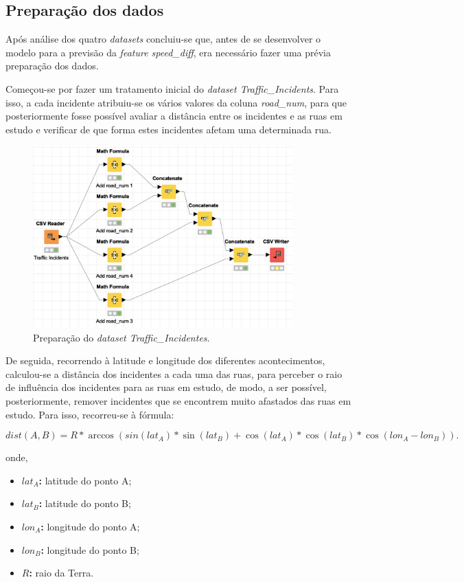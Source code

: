 \documentclass[a4paper, 12pt]{article}
\begin{document}
\subsection{Preparação dos dados}
\label{section:falta}

Após análise dos quatro \textit{datasets} concluiu-se que, antes de se desenvolver o modelo para a previsão da \textit{feature speed\_diff}, era necessário fazer uma prévia preparação dos dados.

Começou-se por fazer um tratamento inicial do \textit{dataset Traffic\_Incidents}. Para isso, a cada incidente atribuiu-se os vários valores da coluna \textit{road\_num}, para que posteriormente fosse possível avaliar a distância entre os incidentes e as ruas em estudo e verificar de que forma estes incidentes afetam uma determinada rua.

\begin{figure}[H]
	\centering
	\includegraphics[width=10cm]{Traffic_Incidents}
	\caption{Preparação do \textit{dataset Traffic\_Incidentes}.}
\end{figure}

De seguida, recorrendo à latitude e longitude dos diferentes acontecimentos, calculou-se a distância dos incidentes a cada uma das ruas, para perceber o raio de influência dos incidentes para as ruas em estudo, de modo, a ser possível, posteriormente, remover incidentes que se encontrem muito afastados das ruas em estudo. Para isso, recorreu-se à fórmula:

$$dist(A, B) = R * \arccos (sin (lat_A) * \sin (lat_B) + \cos (lat_A) * \cos (lat_B) * \cos (lon_A-lon_B)). $$

onde,

\begin{itemize}
	\item \textbf{$lat_A$:} latitude do ponto A;
	\item \textbf{$lat_B$:} latitude do ponto B;
	\item \textbf{$lon_A$:} longitude do ponto A;
	\item \textbf{$lon_B$:} longitude do ponto B;
	\item \textbf{$R$:} raio da Terra.
\end{itemize}
\end{document}
